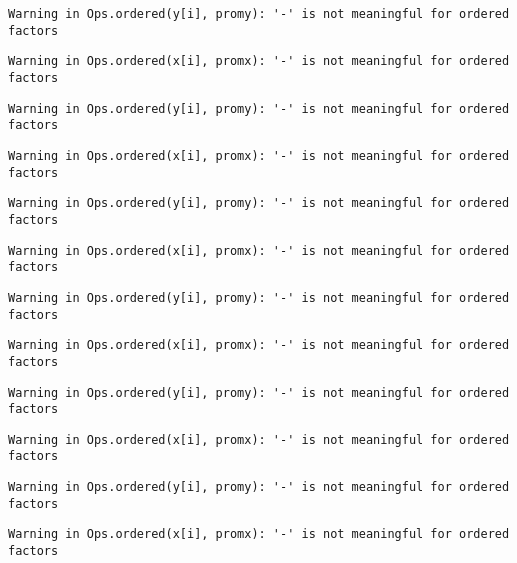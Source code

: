 \documentclass[]{article}
\begin{document}
\begin{verbatim}
Warning in Ops.ordered(y[i], promy): '-' is not meaningful for ordered
factors
\end{verbatim}

\begin{verbatim}
Warning in Ops.ordered(x[i], promx): '-' is not meaningful for ordered
factors
\end{verbatim}

\begin{verbatim}
Warning in Ops.ordered(y[i], promy): '-' is not meaningful for ordered
factors
\end{verbatim}

\begin{verbatim}
Warning in Ops.ordered(x[i], promx): '-' is not meaningful for ordered
factors
\end{verbatim}

\begin{verbatim}
Warning in Ops.ordered(y[i], promy): '-' is not meaningful for ordered
factors
\end{verbatim}

\begin{verbatim}
Warning in Ops.ordered(x[i], promx): '-' is not meaningful for ordered
factors
\end{verbatim}

\begin{verbatim}
Warning in Ops.ordered(y[i], promy): '-' is not meaningful for ordered
factors
\end{verbatim}

\begin{verbatim}
Warning in Ops.ordered(x[i], promx): '-' is not meaningful for ordered
factors
\end{verbatim}

\begin{verbatim}
Warning in Ops.ordered(y[i], promy): '-' is not meaningful for ordered
factors
\end{verbatim}

\begin{verbatim}
Warning in Ops.ordered(x[i], promx): '-' is not meaningful for ordered
factors
\end{verbatim}

\begin{verbatim}
Warning in Ops.ordered(y[i], promy): '-' is not meaningful for ordered
factors
\end{verbatim}

\begin{verbatim}
Warning in Ops.ordered(x[i], promx): '-' is not meaningful for ordered
factors
\end{verbatim}
\end{document}
